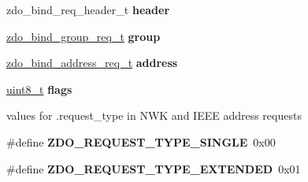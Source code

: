 \begin{DoxyCompactItemize}
\item 
\hypertarget{group__zdo_ga5a520a3fd94801faed2b25261d8cf244}{zdo\-\_\-bind\-\_\-req\-\_\-header\-\_\-t {\bfseries header}}\label{group__zdo_ga5a520a3fd94801faed2b25261d8cf244}

\item 
\hypertarget{group__zdo_gabb9332f3f72154b4e8aa79f4cd615dbf}{\hyperlink{group__zdo_ga41ab3318ee2bd538e044d6d6e101f376}{zdo\-\_\-bind\-\_\-group\-\_\-req\-\_\-t} {\bfseries group}}\label{group__zdo_gabb9332f3f72154b4e8aa79f4cd615dbf}

\item 
\hypertarget{group__zdo_gaeb044cdc1535cba42db0c32a6b116ad2}{\hyperlink{group__zdo_ga68c283a043714a9e40d3674146dd6239}{zdo\-\_\-bind\-\_\-address\-\_\-req\-\_\-t} {\bfseries address}}\label{group__zdo_gaeb044cdc1535cba42db0c32a6b116ad2}

\item 
\hypertarget{group__zdo_gaa2585d779da0ab21273a8d92de9a0ebe}{\hyperlink{group__hal_gae1affc9ca37cfb624959c866a73f83c2}{uint8\-\_\-t} {\bfseries flags}}\label{group__zdo_gaa2585d779da0ab21273a8d92de9a0ebe}

\end{DoxyCompactItemize}
\label{_amgrp01747264fe7bf50731df0522c351974e}%
values for {\ttfamily }.request\-\_\-type in N\-W\-K and I\-E\-E\-E address requests \begin{DoxyCompactItemize}
\item 
\hypertarget{group__zdo_gaa2e60574e4f18025365955f61787b512}{\#define {\bfseries Z\-D\-O\-\_\-\-R\-E\-Q\-U\-E\-S\-T\-\_\-\-T\-Y\-P\-E\-\_\-\-S\-I\-N\-G\-L\-E}~0x00}\label{group__zdo_gaa2e60574e4f18025365955f61787b512}

\item 
\hypertarget{group__zdo_ga0090806cf0aab326024524fec4c8339a}{\#define {\bfseries Z\-D\-O\-\_\-\-R\-E\-Q\-U\-E\-S\-T\-\_\-\-T\-Y\-P\-E\-\_\-\-E\-X\-T\-E\-N\-D\-E\-D}~0x01}\label{group__zdo_ga0090806cf0aab326024524fec4c8339a}

\end{DoxyCompactItemize}
